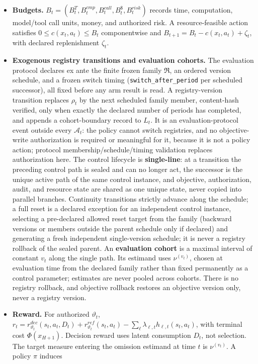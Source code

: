 \documentclass[
  11pt]{article}
\begin{document}
\begin{itemize}
  \(\mathcal A^{att}_t\) so rejection can be logged; they are not
  silently removed from the action space. Guard acceptance is a
  transition constraint, not a reason to erase the attempt.
\item
  \textbf{Budgets.}
  \(B_t=(B_t^T,B_t^{cmp},B_t^{call},B_t^{\$},B_t^{risk})\) records time,
  computation, model/tool call units, money, and authorized risk. A
  resource-feasible action satisfies \(0\le c(x_t,a_t)\le B_t\)
  componentwise and \(B_{t+1}=B_t-c(x_t,a_t)+\zeta_t\), with declared
  replenishment \(\zeta_t\).
\item
  \textbf{Exogenous registry transitions and evaluation cohorts.} The
  evaluation protocol declares ex ante the finite frozen family
  \(\mathfrak R\), an ordered version schedule, and a frozen switch
  timing (\texttt{switch\_after\_period} per scheduled successor), all
  fixed before any arm result is read. A registry-version transition
  replaces \(\rho_t\) by the next scheduled family member, content-hash
  verified, only when exactly the declared number of periods has
  completed, and appends a cohort-boundary record to \(L_t\). It is an
  evaluation-protocol event outside every \(\mathcal A_t\): the policy
  cannot switch registries, and no objective-write authorization is
  required or meaningful for it, because it is not a policy action;
  protocol membership/schedule/timing validation replaces authorization
  here. The control lifecycle is \textbf{single-line}: at a transition
  the preceding control path is sealed and can no longer act, the
  successor is the unique active path of the same control instance, and
  objective, authorization, audit, and resource state are shared as one
  unique state, never copied into parallel branches. Continuity
  transitions strictly advance along the schedule; a full reset is a
  declared exception for an independent control instance, selecting a
  pre-declared allowed reset target from the family (backward versions
  or members outside the parent schedule only if declared) and
  generating a fresh independent single-version schedule; it is never a
  registry rollback of the sealed parent. An \textbf{evaluation cohort}
  is a maximal interval of constant \(v_t\) along the single path. Its
  estimand uses \(\nu^{(v_t)}\), chosen at evaluation time from the
  declared family rather than fixed permanently as a control parameter;
  estimates are never pooled across cohorts. There is no registry
  rollback, and objective rollback restores an objective version only,
  never a registry version.
\item
  \textbf{Reward.} For authorized \(\vartheta_t\),
  \(r_t=r^{dec}_{\vartheta_t}(s_t,a_t,D_t)+r^{ref}_{\vartheta_t}(s_t,a_t)-\sum_\ell\lambda_{\ell,t}h_{\ell,t}(s_t,a_t)\),
  with terminal cost \(\Phi(x_{H+1})\). Decision reward uses latent
  consumption \(D_t\), not selection. The target measure entering the
  omission estimand at time \(t\) is \(\nu^{(v_t)}\). A policy \(\pi\)
  induces
\end{itemize}
\end{document}
